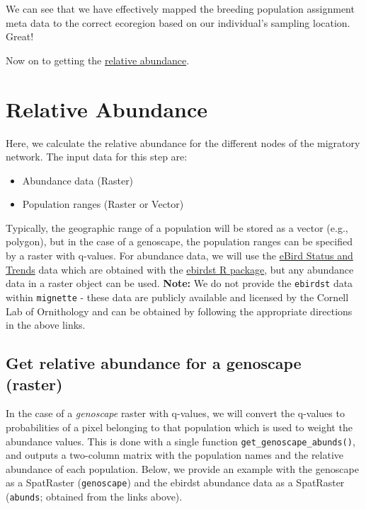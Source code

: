 \documentclass[
]{book}
\providecommand{\tightlist}{%
  \setlength{\itemsep}{0pt}\setlength{\parskip}{0pt}}
\begin{document}
We can see that we have effectively mapped the breeding population assignment meta data to the correct ecoregion based on our individual's sampling location. Great!

Now on to getting the \protect\hyperlink{abundance}{relative abundance}.

\hypertarget{abundance}{%
\chapter{Relative Abundance}\label{abundance}}

Here, we calculate the relative abundance for the different nodes of the migratory network. The input data for this step are:

\begin{itemize}
\tightlist
\item
  Abundance data (Raster)
\item
  Population ranges (Raster or Vector)
\end{itemize}

Typically, the geographic range of a population will be stored as a vector (e.g., polygon), but in the case of a genoscape, the population ranges can be specified by a raster with q-values. For abundance data, we will use the \href{https://science.ebird.org/en/status-and-trends}{eBird Status and Trends} data which are obtained with the \href{https://cornelllabofornithology.github.io/ebirdst/}{ebirdst R package}, but any abundance data in a raster object can be used. \textbf{Note:} We do not provide the \texttt{ebirdst} data within \texttt{mignette} - these data are publicly available and licensed by the Cornell Lab of Ornithology and can be obtained by following the appropriate directions in the above links.

\hypertarget{get-relative-abundance-for-a-genoscape-raster}{%
\section{Get relative abundance for a genoscape (raster)}\label{get-relative-abundance-for-a-genoscape-raster}}

In the case of a \emph{genoscape} raster with q-values, we will convert the q-values to probabilities of a pixel belonging to that population which is used to weight the abundance values. This is done with a single function \texttt{get\_genoscape\_abunds()}, and outputs a two-column matrix with the population names and the relative abundance of each population. Below, we provide an example with the genoscape as a SpatRaster (\texttt{genoscape}) and the ebirdst abundance data as a SpatRaster (\texttt{abunds}; obtained from the links above).
\end{document}
